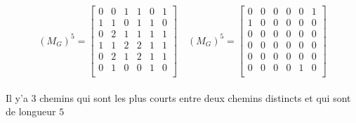 \begin{enumerate}[\rm 1)]
\begin{framed}
\[(M_G)^5=
\begin{bmatrix}
 0&0 &1&1&0&1\\
 1&1 &0&1&1&0\\
 0&2 &1&1&1&1\\
 1&1 &2&2&1&1\\
 0&2 &1&2&1&1\\
 0&1 &0&0&1&0\\
\end{bmatrix}
\quad (M_G)^5= 
\begin{bmatrix}
 0&0 &0&0&0&1\\
 1&0 &0&0&0&0\\
 0&0&0&0&0&0\\
 0&0 &0&0&0&0\\
 0&0 &0&0&0&0\\
 0&0 &0&0&1&0\\
\end{bmatrix}
\]
\\
Il y'a $3$ chemins qui sont les plus courts entre deux chemins distincts et qui sont de longueur $5$ \\

\end{framed}

\end{enumerate}



\newpage